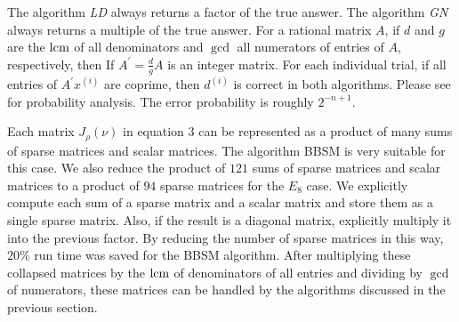 The algorithm {\em LD}
always returns a factor of the true answer.
The algorithm {\em GN}
always returns a multiple of the true answer.
For a rational matrix $A$, if 
$d$ and $g$ are the $\mbox{lcm}$ of all denominators 
and $\gcd$ all numerators of entries of $A$, respectively,
then If $A^\prime = \frac{d}{g}A$ is an integer matrix.
For each individual trial,
if all entries of  $A^\prime x^{(i)}$ are coprime,
then $d^{(i)}$ is correct in both algorithms.
Please see \cite{Saunders::LA::2004} for probability analysis. 
The error probability is roughly $2^{-n + 1}$.

Each matrix $J_\rho(\nu)$ in equation 3 can be represented as
a product of many sums of sparse matrices and scalar matrices.
The algorithm BBSM is very suitable for this case.
We also reduce the product of $121$ sums of sparse matrices and scalar matrices
to a product of $94$ sparse matrices for the $E_8$ case. 
We explicitly compute each sum of a sparse matrix and a scalar matrix and 
store them as a single sparse matrix.  Also, if the result is a diagonal matrix,
explicitly multiply it into the previous factor.
By reducing the number of sparse matrices in this way, 
$20\%$ run time was saved for the BBSM algorithm. 
After multiplying these collapsed matrices 
by the $\mbox{lcm}$ of denominators of all entries and dividing
by $\gcd$ of numerators, these matrices can be handled by the
algorithms discussed in the previous section.


